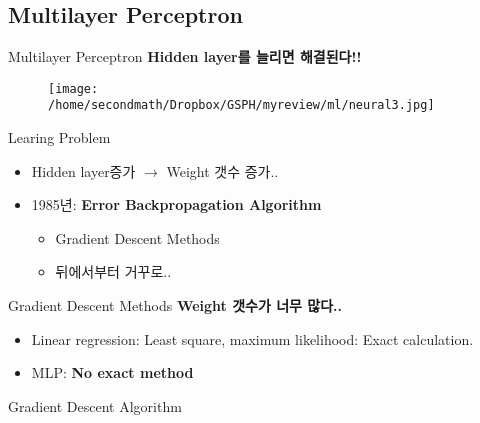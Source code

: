 \documentclass{beamer}
\begin{document}
\subsection{Multilayer Perceptron}
\begin{frame}{Multilayer Perceptron}
\textbf{Hidden layer를 늘리면 해결된다!!}
\begin{figure}
\texttt{[image: /home/secondmath/Dropbox/GSPH/myreview/ml/neural3.jpg]}
\end{figure}
\end{frame}

\begin{frame}{Learing Problem}
\begin{itemize}
  \item Hidden layer증가 $\rightarrow$ Weight 갯수 증가..
  \item 1985년: \textbf{Error Backpropagation Algorithm}\citep{rumelhart1985learning}
  \begin{itemize}
   \item Gradient Descent Methods
   \item 뒤에서부터 거꾸로..
  \end{itemize}
\end{itemize}
\end{frame}

\begin{frame}{Gradient Descent Methods}
\textbf{Weight 갯수가 너무 많다..}
\begin{itemize}
  \item Linear regression: Least square, maximum likelihood: Exact calculation.
  \item MLP: \textbf{No exact method}
\end{itemize}
\end{frame}

\begin{frame}{Gradient Descent Algorithm\citep{gradient}}
\begin{figure}
\centering
{} 
\\
\end{figure}
\end{frame}
\end{document}
